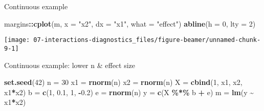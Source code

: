 \documentclass[
  ignorenonframetext,
]{beamer}
\newenvironment{Shaded}{\begin{snugshade}}{\end{snugshade}}
\newcommand{\AttributeTok}[1]{\textcolor[rgb]{0.13,0.29,0.53}{#1}}
\newcommand{\DecValTok}[1]{\textcolor[rgb]{0.00,0.00,0.81}{#1}}
\newcommand{\FloatTok}[1]{\textcolor[rgb]{0.00,0.00,0.81}{#1}}
\newcommand{\FunctionTok}[1]{\textcolor[rgb]{0.13,0.29,0.53}{\textbf{#1}}}
\newcommand{\NormalTok}[1]{#1}
\newcommand{\OtherTok}[1]{\textcolor[rgb]{0.56,0.35,0.01}{#1}}
\newcommand{\SpecialCharTok}[1]{\textcolor[rgb]{0.81,0.36,0.00}{\textbf{#1}}}
\newcommand{\StringTok}[1]{\textcolor[rgb]{0.31,0.60,0.02}{#1}}
\begin{document}
\begin{frame}[fragile]{Continuous example}
\label{continuous-example}
\begin{Shaded}
\begin{Highlighting}[]
\NormalTok{margins}\SpecialCharTok{::}\FunctionTok{cplot}\NormalTok{(m, }\AttributeTok{x =} \StringTok{"x2"}\NormalTok{, }\AttributeTok{dx =} \StringTok{"x1"}\NormalTok{, }\AttributeTok{what =} \StringTok{"effect"}\NormalTok{)}
\FunctionTok{abline}\NormalTok{(}\AttributeTok{h =} \DecValTok{0}\NormalTok{, }\AttributeTok{lty =} \DecValTok{2}\NormalTok{)}
\end{Highlighting}
\end{Shaded}

\texttt{[image: 07-interactions-diagnostics\_files/figure-beamer/unnamed-chunk-9-1]}
\end{frame}

\begin{frame}[fragile]{Continuous example: lower n \& effect size}
\label{continuous-example-lower-n-effect-size}
\begin{Shaded}
\begin{Highlighting}[]
\FunctionTok{set.seed}\NormalTok{(}\DecValTok{42}\NormalTok{)}
\NormalTok{n  }\OtherTok{=} \DecValTok{30}
\NormalTok{x1 }\OtherTok{=} \FunctionTok{rnorm}\NormalTok{(n)}
\NormalTok{x2 }\OtherTok{=} \FunctionTok{rnorm}\NormalTok{(n)}
\NormalTok{X  }\OtherTok{=} \FunctionTok{cbind}\NormalTok{(}\DecValTok{1}\NormalTok{, x1, x2, x1}\SpecialCharTok{*}\NormalTok{x2)}
\NormalTok{b  }\OtherTok{=} \FunctionTok{c}\NormalTok{(}\DecValTok{1}\NormalTok{, }\FloatTok{0.1}\NormalTok{, }\DecValTok{1}\NormalTok{, }\SpecialCharTok{{-}}\FloatTok{0.2}\NormalTok{)}
\NormalTok{e  }\OtherTok{=} \FunctionTok{rnorm}\NormalTok{(n)}
\NormalTok{y  }\OtherTok{=} \FunctionTok{c}\NormalTok{(X }\SpecialCharTok{\%*\%}\NormalTok{ b }\SpecialCharTok{+}\NormalTok{ e)}
\NormalTok{m  }\OtherTok{=} \FunctionTok{lm}\NormalTok{(y }\SpecialCharTok{\textasciitilde{}}\NormalTok{ x1}\SpecialCharTok{*}\NormalTok{x2)}
\end{Highlighting}
\end{Shaded}
\end{frame}
\end{document}
